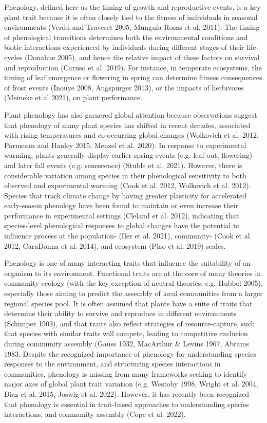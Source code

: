 \documentclass[11pt]{article}
\begin{document}
Phenology, defined here as the timing of growth and reproductive events, is a key plant trait because it is often closely tied to the fitness of individuals in seasonal environments (Verdú and Traveset 2005, Munguía‐Rosas et al. 2011). The timing of phenological transitions determines both the environmental conditions and biotic interactions experienced by individuals during different stages of their life-cycles (Donahue 2005), and hence the relative impact of these factors on survival and reproduction (Caruso et al. 2019). For instance, in temperate ecosystems, the timing of leaf emergence or flowering in spring can determine fitness consequences of frost events (Inouye 2008, Augspurger 2013), or the impacts of herbivores (Meineke et al 2021), on plant performance.

Plant phenology has also garnered global attention because observations suggest that phenology of many plant species has shifted in recent decades, associated with rising temperatures and co-occurring global changes (Wolkovich et al. 2012, Parmesan and Hanley 2015, Menzel et al. 2020). In response to experimental warming, plants generally display earlier spring events (e.g. leaf-out, flowering) and later fall events (e.g. senescence) (Stuble et al. 2021). However, there is considerable variation among species in their phenological sensitivity to both observed and experimental warming (Cook et al. 2012, Wolkovich et al. 2012). Species that track climate change by having greater plasticity for accelerated early-season phenology have been found to maintain or even increase their performance in experimental settings (Cleland et al. 2012), indicating that species-level phenological responses to global changes have the potential to influence process at the population- (Iler et al. 2021), community- (Cook et al. 2012, CaraDonna et al. 2014), and ecosystem (Piao et al. 2019) scales.

Phenology is one of many interacting traits that influence the suitability of an organism to its environment. Functional traits are at the core of many theories in community ecology (with the key exception of neutral theories, e.g. Hubbel 2005), especially those aiming to predict the assembly of local communities from a larger regional species pool. It is often assumed that plants have a suite of traits that determine their ability to survive and reproduce in different environments (Schimper 1903), and that traits also reflect strategies of resource-capture, such that species with similar traits will compete, leading to competitive exclusion during community assembly (Gauss 1932, MacArthur \& Levins 1967, Abrams 1983. Despite the recognized importance of phenology for understanding species responses to the environment, and structuring species interactions in communities, phenology is missing from many frameworks seeking to identify major axes of global plant trait variation (e.g. Westoby 1998, Wright et al. 2004, Diaz et al. 2015, Joswig et al. 2022). However, it has recently been recognized that phenology is essential in trait-based approaches to understanding species interactions, and community assembly (Cope et al. 2022).
\end{document}
